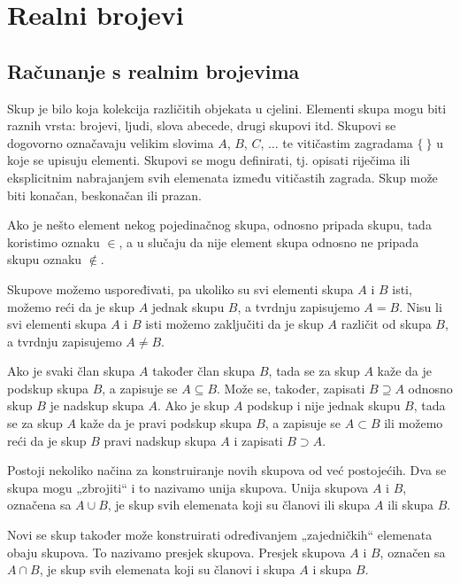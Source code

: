 \chapter{Realni brojevi}\label{ch:realni-brojevi}

\section{Računanje s realnim brojevima}\label{sec:računanje-s-realnim-brojevima}

Skup je bilo koja kolekcija različitih objekata u cjelini.
Elementi skupa mogu biti raznih vrsta: brojevi, ljudi, slova abecede, drugi skupovi itd.
Skupovi se dogovorno označavaju velikim slovima $A$, $B$, $C$, $\ldots$ te vitičastim zagradama $\{\ \}$ u koje se upisuju elementi.
Skupovi se mogu definirati, tj. opisati riječima ili eksplicitnim nabrajanjem svih elemenata između vitičastih zagrada.
Skup može biti konačan, beskonačan ili prazan.

Ako je nešto element nekog pojedinačnog skupa, odnosno pripada skupu, tada koristimo oznaku $\in$, a u slučaju da nije element skupa odnosno ne pripada skupu oznaku $\notin$.

Skupove možemo uspoređivati, pa ukoliko su svi elementi skupa $A$ i $B$ isti, možemo reći da je skup $A$ jednak skupu $B$, a tvrdnju zapisujemo $A = B$.
Nisu li svi elementi skupa $A$ i $B$ isti možemo zaključiti da je skup $A$ različit od skupa $B$, a tvrdnju zapisujemo $A \neq B$.

Ako je svaki član skupa $A$ također član skupa $B$, tada se za skup $A$ kaže da je podskup skupa $B$, a zapisuje se $A \subseteq B$.
Može se, također, zapisati $B \supseteq A$ odnosno skup $B$ je nadskup skupa $A$.
Ako je skup $A$ podskup i nije jednak skupu $B$, tada se za skup $A$ kaže da je pravi podskup skupa $B$, a zapisuje se $A \subset B$ ili možemo reći da je skup $B$ pravi nadskup skupa $A$ i zapisati $B \supset A$.

Postoji nekoliko načina za konstruiranje novih skupova od već postojećih.
Dva se skupa mogu „zbrojiti“ i to nazivamo unija skupova.
Unija skupova $A$ i $B$, označena sa $A \cup B$, je skup svih elemenata koji su članovi ili skupa $A$ ili skupa $B$.

Novi se skup također može konstruirati određivanjem „zajedničkih“ elemenata obaju skupova.
To nazivamo presjek skupova.
Presjek skupova $A$ i $B$, označen sa $A \cap B$, je skup svih elemenata koji su članovi i skupa $A$ i skupa $B$.
